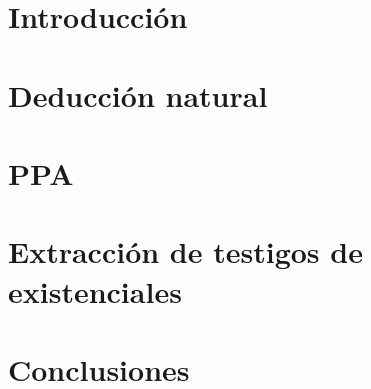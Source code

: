 \documentclass[11pt,a4paper]{tesis}
\begin{document}

\def\autor{Manuel Panichelli}
\def\tituloTesis{
    PPA \vspace{.2cm} \\
    Un asistente de demostraciones tipo\\
    Mizar para lógica clásica de primer orden,\\
    con extracción de testigos basada\vspace{.1cm}\\
    en la traducción de Friedman
}
\def\runtitulo{PPA: Un asistente de demostraciones tipo Mizar para lógica clásica de primer orden con extracción de testigos basada en la traducción de Friedman}
\def\runtitle{PPA: a Mizar-like proof-assistant for classical first-order logic with witness extraction based on Friedman's translation}
\def\director{Pablo Barenbaum}
\def\lugar{Buenos Aires, 2024}



\frontmatter
\pagestyle{empty}


\cleardoublepage


\cleardoublepage


\cleardoublepage
\tableofcontents

\mainmatter
\pagestyle{headings}


\chapter{Introducción}



\chapter{Deducción natural}



\chapter{PPA}



\chapter{Extracción de testigos de existenciales}



\chapter{Conclusiones}



\backmatter
\printbibliography
\end{document}
